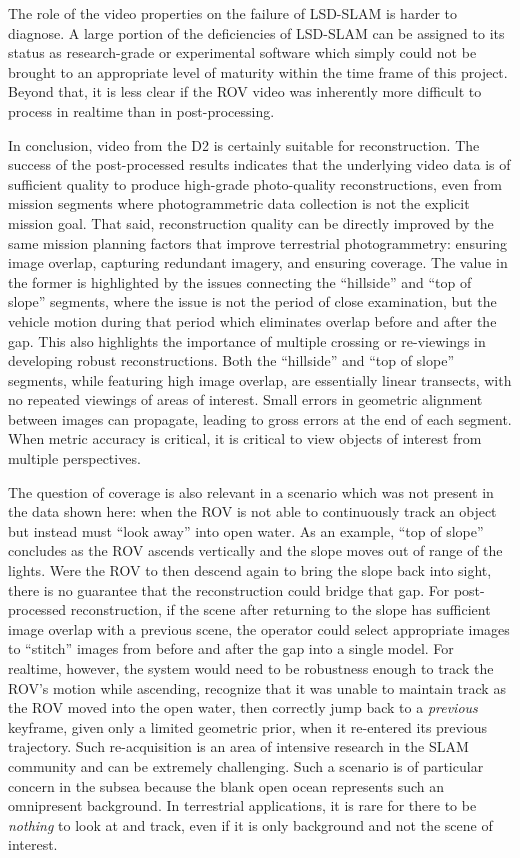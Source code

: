 \documentclass[letterpaper,12pt]{article}
\begin{document}
The role of the video properties on the failure of LSD-SLAM is harder to diagnose.   A large portion of the deficiencies of LSD-SLAM can be assigned to its status as research-grade or experimental software which simply could not be brought to an appropriate level of maturity within the time frame of this project.    Beyond that, it is less clear if the ROV video was inherently more difficult to process in realtime than in post-processing.

In conclusion, video from the D2 is certainly suitable for reconstruction.   The success of the post-processed results indicates that the underlying video data is of sufficient quality to produce high-grade photo-quality reconstructions, even from mission segments where photogrammetric data collection is not the explicit mission goal.   That said, reconstruction quality can be directly improved by the same mission planning factors that improve terrestrial photogrammetry:   ensuring image overlap, capturing redundant imagery, and ensuring coverage.   The value in the former is highlighted by the issues connecting the ``hillside'' and ``top of slope'' segments, where the issue is not the period of close examination, but the vehicle motion during that period which eliminates overlap before and after the gap.   This also highlights the importance of multiple crossing or re-viewings in developing robust reconstructions.   Both the ``hillside'' and ``top of slope'' segments, while featuring high image overlap, are essentially linear transects, with no repeated viewings of areas of interest.   Small errors in geometric alignment between images can propagate, leading to gross errors at the end of each segment.   When metric accuracy is critical, it is critical to view objects of interest from multiple perspectives.   

The question of coverage is also relevant in a scenario which was not present in the data shown here: when the ROV is not able to continuously track an object but instead must ``look away'' into open water.  As an example, ``top of slope'' concludes as the ROV ascends vertically and the slope moves out of range of the lights.     Were the ROV to then descend again to bring the slope back into sight, there is no guarantee that the reconstruction could bridge that gap.   For post-processed reconstruction, if the scene after returning to the slope has sufficient image overlap with a previous scene, the operator could select appropriate images to ``stitch'' images from before and after the gap into a single model.    For realtime, however, the system would need to be robustness enough to track the ROV's motion while ascending, recognize that it was unable to maintain track as the ROV moved into the open water, then correctly jump back to a \textit{previous} keyframe, given only a limited geometric prior, when it re-entered its previous trajectory.  Such re-acquisition is an area of intensive research in the SLAM community and can be extremely challenging.    Such a scenario is of particular concern in the subsea because the blank open ocean represents such an omnipresent background.   In terrestrial applications, it is rare for there to be \textit{nothing} to look at and track, even if it is only background and not the scene of interest.
\end{document}
